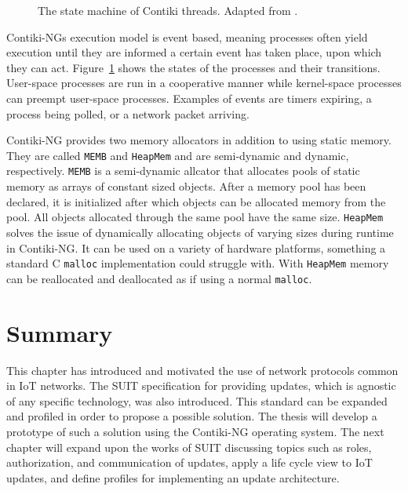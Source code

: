 \documentclass[0-thesis.tex]{subfiles}
\begin{document}
\begin{figure}
    \caption[The state machine of Contiki threads.]
        {The state machine of Contiki threads. Adapted from \parencite{contiki-multithreading}.}
    \label{fig:state-machine}
\end{figure}

Contiki-NGs execution model is event based, meaning processes often yield execution until
they are informed a certain event has taken place, upon which they can act.
Figure~\ref{fig:state-machine} shows the states of the processes and their transitions.
User-space processes are run in a cooperative manner while kernel-space processes can
preempt user-space processes. Examples of events are timers expiring, a process being
polled, or a network packet arriving.

Contiki-NG provides two memory allocators in addition to using static memory. They are
called \texttt{MEMB} and \texttt{HeapMem} and are semi-dynamic and dynamic, respectively.
\texttt{MEMB} is a semi-dynamic allcator that allocates pools of static memory as arrays
of constant sized objects. After a memory pool has been declared, it is initialized after
which objects can be allocated memory from the pool. All objects allocated through the
same pool have the same size. \texttt{HeapMem} solves the issue of dynamically allocating
objects of varying sizes during runtime in Contiki-NG. It can be used on a variety of
hardware platforms, something a standard C \texttt{malloc} implementation could struggle
with. With \texttt{HeapMem} memory can be reallocated and deallocated as if using a normal
\texttt{malloc}.

\section{Summary}
\label{sec:2-summary}
This chapter has introduced and motivated the use of network protocols common in IoT
networks. The SUIT specification for providing updates, which is agnostic of any specific
technology, was also introduced. This standard can be expanded and profiled in order to
propose a possible solution. The thesis will develop a prototype of such a solution using
the Contiki-NG operating system. The next chapter will expand upon the works of SUIT
discussing topics such as roles, authorization, and communication of updates, apply a life
cycle view to IoT updates, and define profiles for implementing an update architecture.
\end{document}
